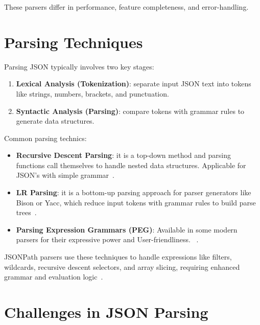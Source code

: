 These parsers differ in performance, feature completeness, and error-handling.

\section{Parsing Techniques}

Parsing JSON typically involves two key stages:

\begin{enumerate}
	\item \textbf{Lexical Analysis (Tokenization)}: separate input JSON text into tokens like strings, numbers, brackets, and punctuation.
	\item \textbf{Syntactic Analysis (Parsing)}: compare tokens with grammar rules to generate data structures.
\end{enumerate}

Common parsing technics:

\begin{itemize}
	\item \textbf{Recursive Descent Parsing}: it is a top-down method and parsing functions call themselves to handle nested data structures. Applicable for JSON’s with simple grammar~\cite{jsonpath_plus}.
	\item \textbf{LR Parsing}: it is a bottom-up parsing approach for parser generators like Bison or Yacc, which reduce input tokens with grammar rules to build parse trees~\cite{postgres_jsonpath}.
	\item \textbf{Parsing Expression Grammars (PEG)}: Available in some modern parsers for their expressive power and User-friendliness. ~\cite{antlr4_jsonpath}.
\end{itemize}

JSONPath parsers use these techniques to handle expressions like filters, wildcards, recursive descent selectors, and array slicing, requiring enhanced grammar and evaluation logic~\cite{ietf_rfc9535}.

\section{Challenges in JSON Parsing}

